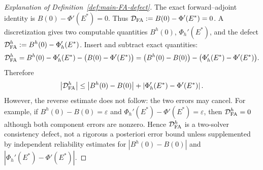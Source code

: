 \documentclass[pdflatex,sn-mathphys-num]{sn-jnl}
\theoremstyle{thmstyleone}
\theoremstyle{definition}
\theoremstyle{remark}
\newcommand{\abs}[1]{\left\lvert#1\right\rvert}
\numberwithin{equation}{section}
\begin{document}
\begin{proof}[Explanation of Definition~\ref{def:main-FA-defect}]
The exact forward--adjoint identity is
$\displaystyle 
B(0)-\Phi'(E^*)=0$.
Thus
$\displaystyle 
\mathcal D_{\rm FA}:=B(0)-\Phi'(E^*)=0$.
A discretization gives two computable quantities
$B^h(0)$,
$\Phi_h'(E^*)$,
and the defect
$\displaystyle 
\mathcal D_{\rm FA}^h
:=
B^h(0)-\Phi_h'(E^*)$.
Insert and subtract exact quantities:
\[ 
\mathcal D_{\rm FA}^h=
B^h(0)-\Phi_h'(E^*)
-
\big(B(0)-\Phi'(E^*)\big)=
\big(B^h(0)-B(0)\big)
-
\big(\Phi_h'(E^*)-\Phi'(E^*)\big).
\]
Therefore
\[ 
\abs{\mathcal D_{\rm FA}^h}
\le
\abs{B^h(0)-B(0)}
+
\abs{\Phi_h'(E^*)-\Phi'(E^*)}.
\]
However, the reverse estimate does not follow: the two errors may cancel. For
example, if
$\displaystyle 
B^h(0)-B(0)=\varepsilon$ and
$\displaystyle 
\Phi_h'(E^*)-\Phi'(E^*)=\varepsilon$,
then
$\displaystyle 
\mathcal D_{\rm FA}^h=0$
although both component errors are nonzero. Hence
$\mathcal D_{\rm FA}^h$
is a two-solver consistency defect, not a rigorous a posteriori error bound
unless supplemented by independent reliability estimates for
$\displaystyle 
\abs{B^h(0)-B(0)}$
and
$\abs{\Phi_h'(E^*)-\Phi'(E^*)}$.
\end{proof}
\end{document}
